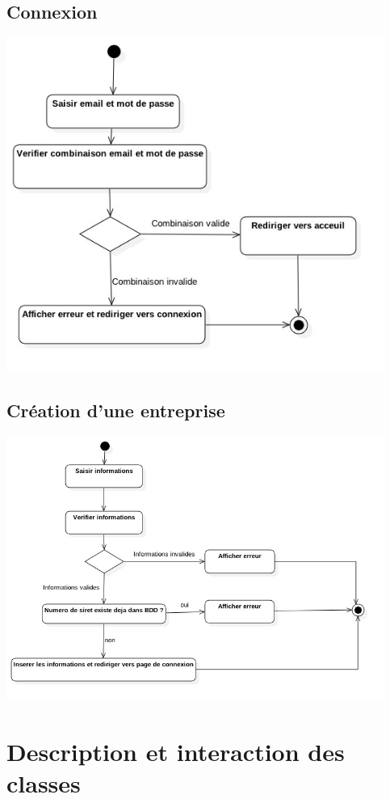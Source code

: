 \documentclass{article}
\begin{document}
\subsection{Connexion}
\begin{center}
  \includegraphics[width=350pt]{diagram/activiteConnexion}
\end{center}
\subsection{Création d'une entreprise}
\begin{center}
  \includegraphics[width=350pt]{diagram/activiteCreerEntreprise}
\end{center}


\section{Description et interaction des classes}
\end{document}
